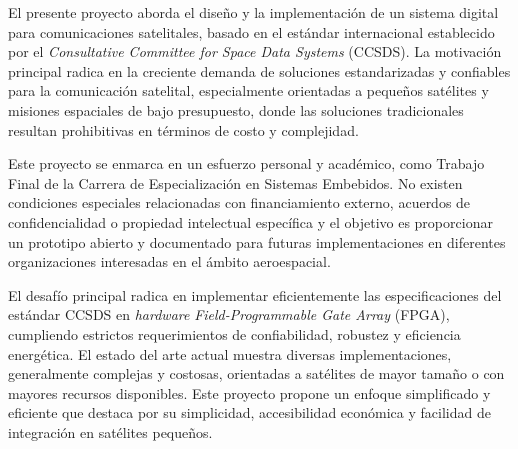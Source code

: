 \documentclass[
11pt, %
]{charter}
\begin{document}
El presente proyecto aborda el diseño y la implementación de un sistema digital para comunicaciones satelitales, basado en el estándar internacional establecido por el \textit{Consultative Committee for Space Data Systems} (CCSDS). La motivación principal radica en la creciente demanda de soluciones estandarizadas y confiables para la comunicación satelital, especialmente orientadas a pequeños satélites y misiones espaciales de bajo presupuesto, donde las soluciones tradicionales resultan prohibitivas en términos de costo y complejidad.

Este proyecto se enmarca en un esfuerzo personal y académico, como Trabajo Final de la Carrera de Especialización en Sistemas Embebidos. No existen condiciones especiales relacionadas con financiamiento externo, acuerdos de confidencialidad o propiedad intelectual específica y el objetivo es proporcionar un prototipo abierto y documentado para futuras implementaciones en diferentes organizaciones interesadas en el ámbito aeroespacial.

El desafío principal radica en implementar eficientemente las especificaciones del estándar CCSDS en \textit{hardware} \textit{Field-Programmable Gate Array} (FPGA), cumpliendo estrictos requerimientos de confiabilidad, robustez y eficiencia energética. El estado del arte actual muestra diversas implementaciones, generalmente complejas y costosas, orientadas a satélites de mayor tamaño o con mayores recursos disponibles. Este proyecto propone un enfoque simplificado y eficiente que destaca por su simplicidad, accesibilidad económica y facilidad de integración en satélites pequeños.
\end{document}
